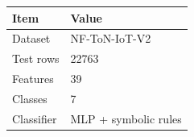 \begin{tabular}{ll}
\hline
Item & Value \\
\hline
Dataset & NF-ToN-IoT-V2 \\
Test rows & 22763 \\
Features & 39 \\
Classes & 7 \\
Classifier & MLP + symbolic rules \\
\hline
\end{tabular}
